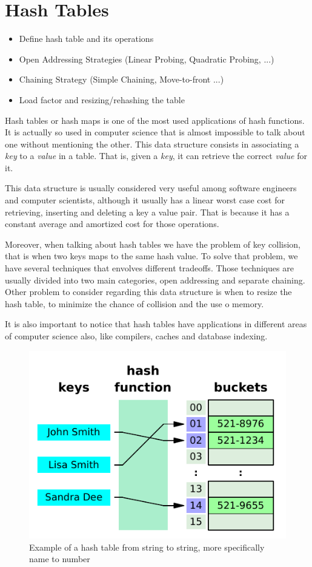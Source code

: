 \chapter{Hash Tables}
\label{cap:Hash Tables}

\begin{itemize}
\item Define hash table and its operations
\item Open Addressing Strategies (Linear Probing, Quadratic Probing, ...)
\item Chaining Strategy (Simple Chaining, Move-to-front ...)
\item Load factor and resizing/rehashing the table
\end{itemize}


Hash tables or hash maps is one of the most used applications of hash functions. It is actually so used in computer science that is almost impossible to talk about one without mentioning the other. This data structure consists in associating a \textit{key} to a \textit{value} in a table. That is, given a \textit{key}, it can retrieve the correct \textit{value} for it.

This data structure is usually considered very useful among software engineers and computer scientists, although it usually has a linear worst case cost for retrieving, inserting and deleting a key a value pair. That is because it has a constant average and amortized cost for those operations.

Moreover, when talking about hash tables we have the problem of key collision, that is when two keys maps to the same hash value. To solve that problem, we have several techniques that envolves different tradeoffs. Those techniques are usually divided into two main categories, open addressing and separate chaining. Other problem to consider regarding this data structure is when to resize the hash table, to minimize the chance of collision and the use o memory.

It is also important to notice that hash tables have applications in different areas of computer science also, like compilers, caches and database indexing.


\begin{figure}[h!]
  \centering
  \includegraphics[width=12cm]{figuras/hash-table.pdf}
  \caption{Example of a hash table from string to string, more specifically name to number}
\end{figure}
